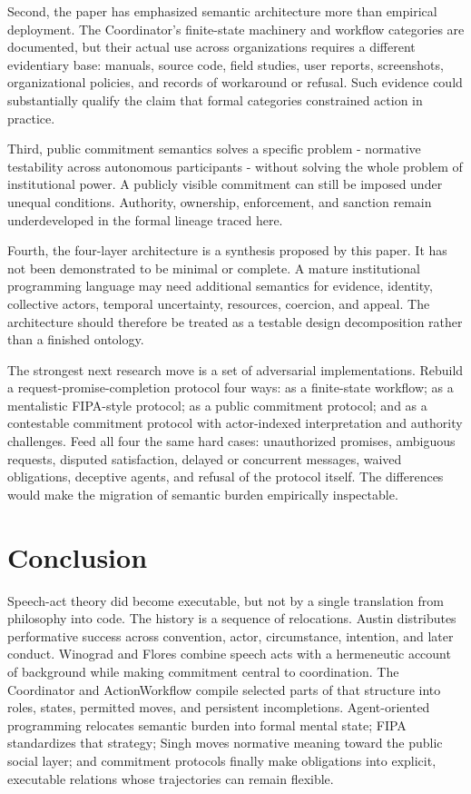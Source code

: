 \documentclass[11pt]{article}
\begin{document}
Second, the paper has emphasized semantic architecture more than empirical deployment. The Coordinator's finite-state machinery and workflow categories are documented, but their actual use across organizations requires a different evidentiary base: manuals, source code, field studies, user reports, screenshots, organizational policies, and records of workaround or refusal. Such evidence could substantially qualify the claim that formal categories constrained action in practice.

Third, public commitment semantics solves a specific problem - normative testability across autonomous participants - without solving the whole problem of institutional power. A publicly visible commitment can still be imposed under unequal conditions. Authority, ownership, enforcement, and sanction remain underdeveloped in the formal lineage traced here.

Fourth, the four-layer architecture is a synthesis proposed by this paper. It has not been demonstrated to be minimal or complete. A mature institutional programming language may need additional semantics for evidence, identity, collective actors, temporal uncertainty, resources, coercion, and appeal. The architecture should therefore be treated as a testable design decomposition rather than a finished ontology.

The strongest next research move is a set of adversarial implementations. Rebuild a request-promise-completion protocol four ways: as a finite-state workflow; as a mentalistic FIPA-style protocol; as a public commitment protocol; and as a contestable commitment protocol with actor-indexed interpretation and authority challenges. Feed all four the same hard cases: unauthorized promises, ambiguous requests, disputed satisfaction, delayed or concurrent messages, waived obligations, deceptive agents, and refusal of the protocol itself. The differences would make the migration of semantic burden empirically inspectable.

\section{Conclusion}
Speech-act theory did become executable, but not by a single translation from philosophy into code. The history is a sequence of relocations. Austin distributes performative success across convention, actor, circumstance, intention, and later conduct. Winograd and Flores combine speech acts with a hermeneutic account of background while making commitment central to coordination. The Coordinator and ActionWorkflow compile selected parts of that structure into roles, states, permitted moves, and persistent incompletions. Agent-oriented programming relocates semantic burden into formal mental state; FIPA standardizes that strategy; Singh moves normative meaning toward the public social layer; and commitment protocols finally make obligations into explicit, executable relations whose trajectories can remain flexible. \cite{austin1962things,winogradflores1986understanding,medinamora1992actionworkflow,shoham1993aop,fipa2002cal,singh1998rethinking,yolumsingh2002flexible}
\end{document}
